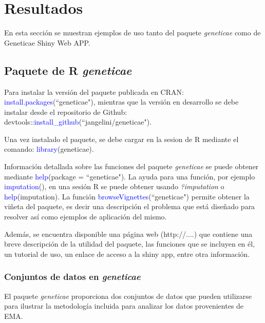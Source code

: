 

\chapter{Resultados}

En esta sección se muestran ejemplos de uso tanto del paquete \emph{geneticae} como de Geneticae Shiny Web APP. 

\section{Paquete de R \emph{geneticae}}

Para instalar la versión del paquete publicada en CRAN: \textcolor{blue}{install.packages}(``geneticae"), mientras que la versión en desarrollo se debe instalar desde el repositorio de Github: devtools::\textcolor{blue}{install\_github}(``jangelini/geneticae"). 

Una vez instalado el paquete, se debe cargar en la sesion de R mediante el comando: \textcolor{blue}{library}(geneticae). 

Información detallada sobre las funciones del paquete \emph{geneticae} se puede obtener mediante \textcolor{blue}{help}(package = ``geneticae"). La ayuda para una función, por ejemplo \textcolor{blue}{imputation}(), en una sesión R se puede obtener usando \emph{?imputation} o \textcolor{blue}{help}(imputation). La función \textcolor{blue}{browseVignettes}(``geneticae") permite obtener la viñeta del paquete, es decir una descripción el problema que está diseñado para resolver así como ejemplos de aplicación del mismo. 

Además, se encuentra disponible una página web (http://....) que contiene una breve descripción de la utilidad del paquete, las funciones que se incluyen en él, un tutorial de uso, un enlace de acceso a la shiny app, entre otra información.


\subsection{Conjuntos de datos en \emph{geneticae}}
\label{subsec:datosejemplos}
El paquete \emph{geneticae} proporciona dos conjuntos de datos que pueden utilizarse para ilustrar la metodología incluida para analizar los datos provenientes de EMA. 

